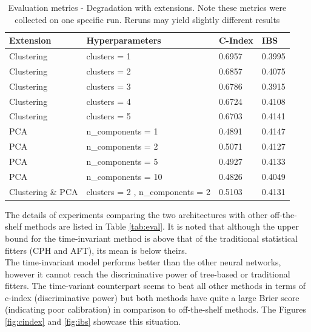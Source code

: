\documentclass[%
 twocolumn,
 reprint,
 amsmath,amssymb,
 aps,nofootinbib
]{revtex4-2}
\begin{document}
\begin{table}
  \centering
  \begin{tabular}{|p{2cm}|p{3cm}|p{1.4cm}|p{1cm}|}
     \hline
    \textbf{Extension} & \textbf{Hyperparameters} & \textbf{C-Index} & \textbf{IBS} \\
    \hline
    Clustering & clusters = 1 & 0.6957 & 0.3995 \\
    \hline
    Clustering & clusters = 2 & 0.6857 & 0.4075 \\
    \hline
    Clustering & clusters = 3 & 0.6786 & 0.3915 \\
    \hline
    Clustering & clusters = 4 & 0.6724 & 0.4108 \\
    \hline
    Clustering & clusters = 5 & 0.6703 & 0.4141 \\
    \hline
    PCA & n\_components = 1 & 0.4891 & 0.4147\\
    \hline
    PCA & n\_components = 2 & 0.5071 & 0.4127\\
    \hline
    PCA & n\_components = 5 & 0.4927 &  0.4133\\
    \hline
    PCA & n\_components = 10 & 0.4826 & 0.4049\\
    \hline
    Clustering \& PCA & clusters = 2 , n\_components = 2& 0.5103 & 0.4131\\
    \hline
  \end{tabular}
  \caption[Evaluation Metrics]{Evaluation metrics - Degradation with extensions. Note these metrics were collected on one specific run. Reruns may yield slightly different results}
  \label{tab:eval_degrad}
\end{table}

The details of experiments comparing the two architectures with other off-the-shelf methods are listed in Table \ref{tab:eval}. It is noted that although the upper bound for the time-invariant method is above that of the traditional statistical fitters (CPH and AFT), its mean is below theirs. \\

The time-invariant model performs better than the other neural networks, however it cannot reach the discriminative power of tree-based or traditional fitters. The time-variant counterpart seems to beat all other methods in terms of c-index (discriminative power) but both methods have quite a large Brier score (indicating poor calibration) in comparison to off-the-shelf methods. The Figures \ref{fig:cindex} and \ref{fig:ibs} showcase this situation.\\
\end{document}
